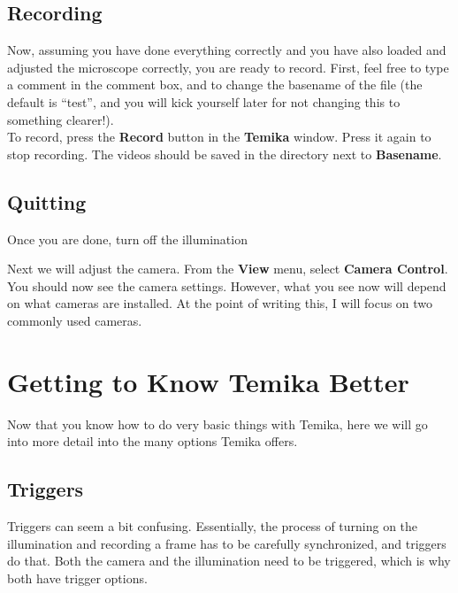 \documentclass{article}
\begin{document}
\newpage

\subsection{Recording}

Now, assuming you have done everything correctly and you have also loaded and adjusted the microscope correctly, you are ready to record. First, feel free to type a comment in the comment box, and to change the basename of the file (the default is ``test'', and you will kick yourself later for not changing this to something clearer!).\\

To record, press the \textbf{Record} button in the \textbf{Temika} window. Press it again to stop recording. The videos should be saved in the directory next to \textbf{Basename}.

\newpage

\subsection{Quitting}

Once you are done, turn off the illumination

Next we will adjust the camera. From the \textbf{View} menu, select \textbf{Camera Control}.\\

You should now see the camera settings. However, what you see now will depend on what cameras are installed. At the point of writing this, I will focus on two commonly used cameras.\\

\newpage

\section{Getting to Know Temika Better}

Now that you know how to do very basic things with Temika, here we will go into more detail into the many options Temika offers.

\newpage

\subsection{Triggers}

Triggers can seem a bit confusing. Essentially, the process of turning on the illumination and recording a frame has to be carefully synchronized, and triggers do that. Both the camera and the illumination need to be triggered, which is why both have trigger options.\\ 
\end{document}
